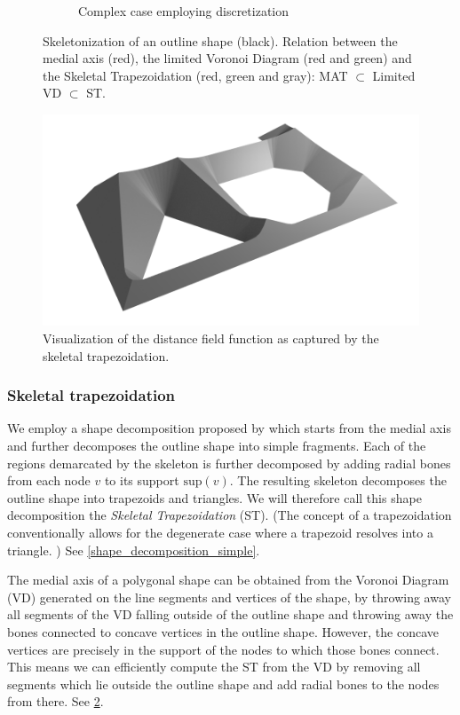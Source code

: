 \begin{figure}
\begin{subfigure}{0.65\columnwidth}
\caption{Complex case employing discretization}
\label{shape_decomp_complex}
\end{subfigure}
\caption{
Skeletonization of an outline shape (black).
Relation between the medial axis (red), the limited Voronoi Diagram (red and green) and the Skeletal Trapezoidation (red, green and gray): MAT $\subset$ Limited VD $\subset$ ST.
}
\label{skeletonization_comparison}
\end{figure}


\begin{figure} \centering
\includegraphics[width=.75\columnwidth]{sources/method/mat_3d_blender_render.png}
\caption{
Visualization of the distance field function as captured by the skeletal trapezoidation.
}
\label{mat_3d}
\end{figure}



\subsubsection{Skeletal trapezoidation}
We employ a shape decomposition proposed by \citeauthor{Ding2016a} which starts from the medial axis and further decomposes the outline shape into simple fragments. \cite{Ding2016a}
Each of the regions demarcated by the skeleton is further decomposed by adding radial bones from each node $v$ to its support $\text{sup}(v)$.
The resulting skeleton decomposes the outline shape into trapezoids and triangles.
We will therefore call this shape decomposition the \emph{Skeletal Trapezoidation} (ST).
(The concept of a trapezoidation conventionally allows for the degenerate case where a trapezoid resolves into a triangle. \cite{chazelle1984,fournier1984})
See \cref{shape_decomposition_simple}.


The medial axis of a polygonal shape can be obtained from the Voronoi Diagram (VD) generated on the line segments and vertices of the shape, by throwing away all segments of the VD falling outside of the outline shape and throwing away the bones connected to concave vertices in the outline shape. \cite{lee1982medial}
However, the concave vertices are precisely in the support of the nodes to which those bones connect.
This means we can efficiently compute the ST from the VD by removing all segments which lie outside the outline shape and add radial bones to the nodes from there.
See \cref{skeletonization_comparison}.


